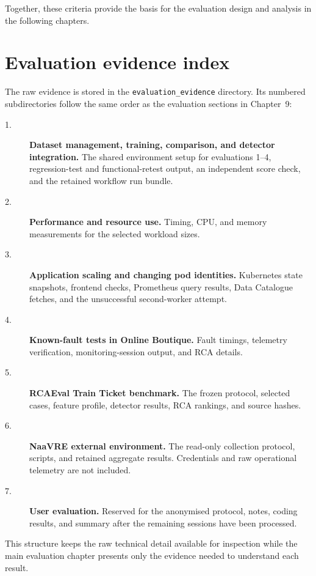 Together, these criteria provide the basis for the evaluation design and analysis in the following chapters.


\section{Evaluation evidence index}
\label{app:evaluation-evidence}

The raw evidence is stored in the \texttt{evaluation\_evidence} directory. Its numbered subdirectories follow the same order as the evaluation sections in Chapter~9:

\begin{description}

    \item[1.] \textbf{Dataset management, training, comparison, and detector integration.} The shared environment setup for evaluations 1--4, regression-test and functional-retest output, an independent score check, and the retained workflow run bundle.
    \item[2.] \textbf{Performance and resource use.} Timing, CPU, and memory measurements for the selected workload sizes.
    \item[3.] \textbf{Application scaling and changing pod identities.} Kubernetes state snapshots, frontend checks, Prometheus query results, Data Catalogue fetches, and the unsuccessful second-worker attempt.
    \item[4.] \textbf{Known-fault tests in Online Boutique.} Fault timings, telemetry verification, monitoring-session output, and RCA details.
    \item[5.] \textbf{RCAEval Train Ticket benchmark.} The frozen protocol, selected cases, feature profile, detector results, RCA rankings, and source hashes.
    \item[6.] \textbf{NaaVRE external environment.} The read-only collection protocol, scripts, and retained aggregate results. Credentials and raw operational telemetry are not included.
    \item[7.] \textbf{User evaluation.} Reserved for the anonymised protocol, notes, coding results, and summary after the remaining sessions have been processed.
\end{description}

This structure keeps the raw technical detail available for inspection while the main evaluation chapter presents only the evidence needed to understand each result.
